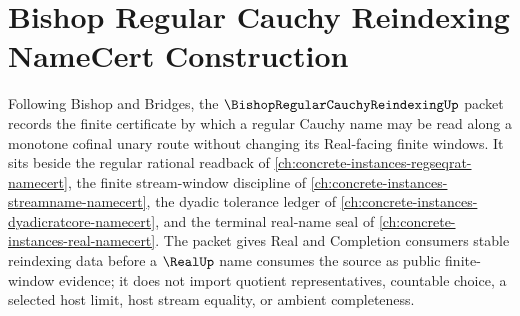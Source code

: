 \chapter{Bishop Regular Cauchy Reindexing NameCert Construction}
\label{ch:concrete-instances-bishop-regular-cauchy-reindexing-namecert}

Following Bishop and Bridges, the $\BishopRegularCauchyReindexingUp$ packet records the finite certificate by which a regular Cauchy name may be read along a monotone cofinal unary route without changing its Real-facing finite windows. It sits beside the regular rational readback of \autoref{ch:concrete-instances-regseqrat-namecert}, the finite stream-window discipline of \autoref{ch:concrete-instances-streamname-namecert}, the dyadic tolerance ledger of \autoref{ch:concrete-instances-dyadicratcore-namecert}, and the terminal real-name seal of \autoref{ch:concrete-instances-real-namecert}. The packet gives Real and Completion consumers stable reindexing data before a $\RealUp$ name consumes the source as public finite-window evidence; it does not import quotient representatives, countable choice, a selected host limit, host stream equality, or ambient completeness.

